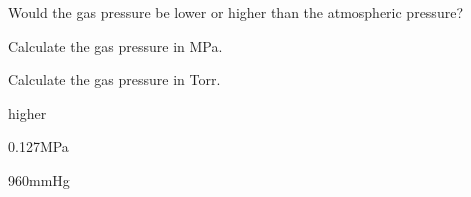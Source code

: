 \documentclass[main.tex]{subfiles}
\begin{document}
\begin{multicols*}{2}
\begin{question}[ID=\the\value{numA}]
\begin{center}
\begin{tikzpicture}[thick,scale=0.9, every node/.style={transform shape}]
%
%
%
%


\end{tikzpicture}\end{center}

\begin{inparaenum}[(a)]	
\item  Would the gas pressure be lower or higher than the atmospheric pressure?
\item  Calculate the gas pressure in MPa.
\item  Calculate the gas pressure in Torr.
\end{inparaenum} 
\end{question}
\begin{solution}
\begin{inparaenum}[(a)]	
\item  higher 
\item  0.127MPa
\item  960mmHg
\end{inparaenum} 
\hspace{0.1cm}\end{solution}%


\end{multicols*}
\end{document}
